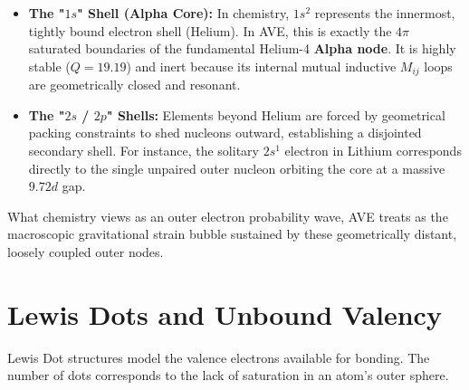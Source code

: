 \begin{itemize}
    \item \textbf{The "$1s$" Shell (Alpha Core):} In chemistry, $1s^2$ represents the innermost, tightly bound electron shell (Helium). In AVE, this is exactly the $4\pi$ saturated boundaries of the fundamental Helium-4 \textbf{Alpha node}. It is highly stable ($Q=19.19$) and inert because its internal mutual inductive $M_{ij}$ loops are geometrically closed and resonant.
    \item \textbf{The "$2s$ / $2p$" Shells:} Elements beyond Helium are forced by geometrical packing constraints to shed nucleons outward, establishing a disjointed secondary shell. For instance, the solitary $2s^1$ electron in Lithium corresponds directly to the single unpaired outer nucleon orbiting the core at a massive $9.72d$ gap.
\end{itemize}
What chemistry views as an outer electron probability wave, AVE treats as the macroscopic gravitational strain bubble sustained by these geometrically distant, loosely coupled outer nodes.

\section{Lewis Dots and Unbound Valency}
Lewis Dot structures model the valence electrons available for bonding. The number of dots corresponds to the lack of saturation in an atom's outer sphere.

